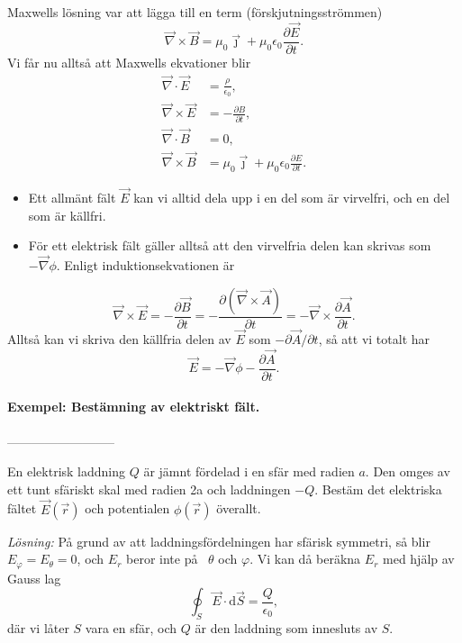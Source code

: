 \documentclass[%
oneside,                 %
final,                   %
10pt]{article}
\begin{document}
Maxwells lösning var att lägga till en term (förskjutningsströmmen)
\begin{equation}
  \vec{\nabla} \times \vec{B} = \mu_0 \vec{\jmath} + \mu_0 \epsilon_0 \frac{\partial \vec{E}}{\partial t}.
\end{equation}
Vi får nu alltså att Maxwells ekvationer blir
\begin{align}
  \vec{\nabla} \cdot \vec{E} &= \frac{\rho}{\epsilon_0}, \\
  \vec{\nabla} \times \vec{E} &= - \frac{\partial B}{\partial t}, \\
  \vec{\nabla} \cdot \vec{B} &= 0, \\
  \vec{\nabla} \times \vec{B} &= \mu_0 \vec{\jmath} + \mu_0 \epsilon_0 
\frac{\partial E}{\partial t}.
\end{align}

\begin{itemize}
\item Ett allmänt fält $\vec{E}$ kan vi alltid dela upp i en del som är virvelfri, och en del som är källfri. 

\item För ett elektrisk fält gäller alltså att den virvelfria delen kan skrivas som $-\vec{\nabla} \phi$.  Enligt induktionsekvationen är
\end{itemize}

\noindent
$$
\vec{\nabla} \times \vec{E} = - \frac{\partial \vec{B}}{\partial t} = -
\frac{\partial (\vec{\nabla} \times \vec{A})}{\partial t} = - \vec{\nabla} \times 
\frac{\partial \vec{A}}{\partial t}.
$$
Alltså kan vi skriva den källfria delen av $\vec{E}$ som
$-\partial \vec{A} / \partial t$, så att vi totalt har
\begin{equation}
  \vec{E} = - \vec{\nabla} \phi - \frac{\partial \vec{A}}{\partial t}.
\end{equation}

\paragraph{Exempel: Bestämning av elektriskt fält.}
--------------------------

En elektrisk laddning $Q$ är jämnt fördelad i en sfär med radien $a$. Den omges av ett tunt sfäriskt skal med radien 2a och laddningen $-Q$. Bestäm det elektriska fältet $\vec{E}(\vec{r})$ och potentialen $\phi(\vec{r})$ överallt.


\vspace{3mm}


\emph{Lösning:} På grund av att laddningsfördelningen har sfärisk
symmetri, så blir $E_\varphi = E_\theta = 0$, och $E_r$ beror inte p\aa
~$\theta$ och $\varphi$.  Vi kan då beräkna $E_r$ med hjälp av Gauss
lag
\begin{equation}
  \oint_S \vec{E} \cdot \mbox{d}\vec{S} = \frac{Q}{\epsilon_0},
\end{equation}
där vi låter $S$ vara en sfär, och $Q$ är den laddning som innesluts
av $S$.  
\end{document}
